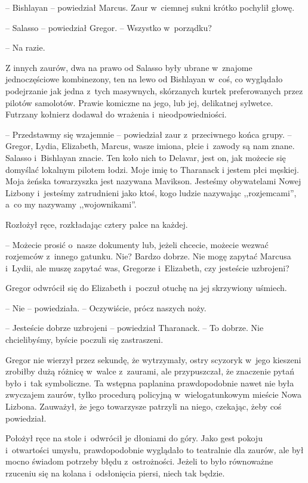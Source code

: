 \documentclass[oneside,polish,12pt,sfheadings]{mwbk}
\begin{document}
-- Bishlayan -- powiedział Marcus. Zaur w~ciemnej sukni krótko pochylił
głowę.

-- Salasso -- powiedział Gregor. -- Wszystko w~porządku?

-- Na razie.

Z innych zaurów, dwa na prawo od Salasso były ubrane w~znajome
jednoczęściowe kombinezony, ten na lewo od Bishlayan w~coś, co wyglądało
podejrzanie jak jedna z~tych masywnych, skórzanych kurtek preferowanych
przez pilotów samolotów. Prawie komiczne na jego, lub jej, delikatnej
sylwetce. Futrzany kołnierz dodawał do wrażenia i~nieodpowiedniości.

-- Przedstawmy się wzajemnie -- powiedział zaur z~przeciwnego końca grupy.
-- Gregor, Lydia, Elizabeth, Marcus, wasze imiona, płcie i~zawody są nam
znane. Salasso i~Bishlayan znacie. Ten koło nich to Delavar, jest on,
jak możecie się domyślać lokalnym pilotem łodzi. Moje imię to Tharanack
i jestem płci męskiej. Moja żeńska towarzyszka jest nazywana Mavikson.
Jesteśmy obywatelami Nowej Lizbony i~jesteśmy zatrudnieni jako ktoś,
kogo ludzie nazywając ,,rozjemcami'', a~co my nazywamy ,,wojownikami''.

Rozłożył ręce, rozkładając cztery palce na każdej. 

-- Możecie prosić o~nasze dokumenty lub, jeżeli chcecie, możecie wezwać rozjemców z~innego
gatunku. Nie? Bardzo dobrze. Nie mogę zapytać Marcusa i~Lydii, ale muszę
zapytać was, Gregorze i~Elizabeth, czy jesteście uzbrojeni?

Gregor odwrócił się do Elizabeth i~poczuł otuchę na jej skrzywiony
uśmiech.

-- Nie -- powiedziała. -- Oczywiście, prócz naszych noży.

-- Jesteście dobrze uzbrojeni -- powiedział Tharanack. -- To dobrze. Nie
chcielibyśmy, byście poczuli się zastraszeni.

Gregor nie wierzył przez sekundę, że wytrzymały, ostry scyzoryk w~jego
kieszeni zrobiłby dużą różnicę w~walce z~zaurami, ale przypuszczał, że
znaczenie pytań było i~tak symboliczne. Ta wstępna paplanina
prawdopodobnie nawet nie była zwyczajem zaurów, tylko procedurą
policyjną w~wielogatunkowym mieście Nowa Lizbona. Zauważył, że jego
towarzysze patrzyli na niego, czekając, żeby coś powiedział.

Położył ręce na stole i~odwrócił je dłoniami do góry. Jako gest pokoju i~otwartości umysłu, prawdopodobnie wyglądało to teatralnie dla zaurów,
ale był mocno świadom potrzeby błędu z~ostrożności. Jeżeli to było
równoważne rzuceniu się na kolana i~odsłonięcia piersi, niech tak
będzie.
\end{document}
